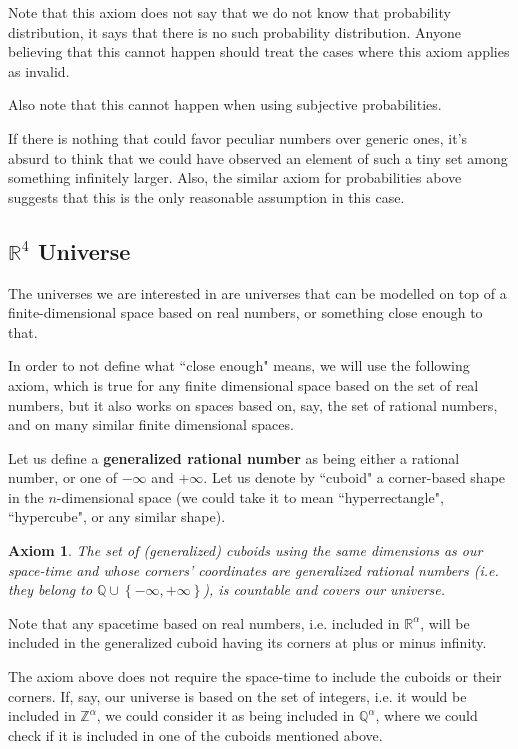 \documentclass[a4paper
,draft
]{article}
\def\reale{\mathbb{R}}
\def\intregi{\mathbb{Z}}
\def\rationale{\mathbb{Q}}
\newcommand{\multime}[1]{\left\{ #1 \right\}}
\newcommand{\definitie}[1]{\textbf{#1}}
\newcommand{\ghilimele}[1]{``#1"}
\newtheorem{axiom}{Axiom}
\begin{document}
Note that this axiom does not say that we do not know that probability
distribution, it says that there is no such probability distribution.
Anyone believing that this cannot happen should treat the cases where
this axiom applies as invalid.

Also note that this cannot happen when using subjective probabilities.

If there is nothing that could favor
peculiar numbers over generic ones, it's absurd to think that we could have
observed an element of such a tiny set among something infinitely larger.
Also, the similar axiom for probabilities above suggests that this is the only
reasonable assumption in this case.

\subsection{$\reale^4$ Universe}

The universes we are interested in are universes that can be
modelled on top of a finite-dimensional space based on real numbers,
or something close enough to that.

In order to not define what \ghilimele{close enough} means, we will use
the following axiom, which is true for any finite dimensional space
based on the set of real numbers, but it also works on spaces based on,
say, the set of rational numbers, and on many similar finite dimensional spaces.

Let us define a \definitie{generalized rational number} as being either a
rational number, or one of $-\infty$ and $+\infty$. Let us denote by
\ghilimele{cuboid} a corner-based shape in the $n$-dimensional space
(we could take it to mean \ghilimele{hyperrectangle}, \ghilimele{hypercube},
or any similar shape).

\begin{axiom}\label{ax:rationalcovering}
  The set of (generalized) cuboids using the same dimensions as our space-time
  and whose corners' coordinates are generalized rational numbers (i.e. they
  belong to $\rationale\cup\multime{-\infty, +\infty}$),
  is countable and covers our universe.
\end{axiom}

Note that any spacetime based on real numbers, i.e. included
in $\reale^\alpha$, will be included in the generalized cuboid having
its corners at plus or minus infinity.

The axiom above does not require the space-time to include the cuboids or
their corners.
If, say, our universe is based on the set of integers, i.e.
it would be included in $\intregi^\alpha$,
we could consider it as being included in $\rationale^\alpha$,
where we could check if it is included in one of the cuboids mentioned
above.
\end{document}
